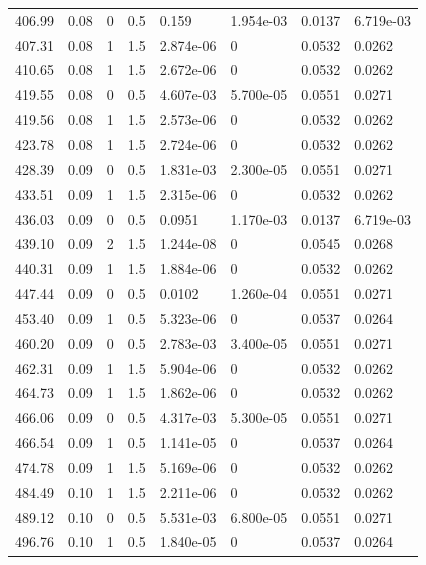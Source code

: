 \documentclass[preview]{standalone}
\begin{document}
{{{\begin{tabular}{L{1.2cm}C{1.2cm} C{0.3cm}C{0.5cm} C{1.4cm}C{1.4cm} C{1.4cm}C{1.4cm}}
  406.99  &  0.08  & 0     & 0.5 &  0.159  & 1.954e-03  & 0.0137 &  6.719e-03   \\ 
  407.31  &  0.08  & 1     & 1.5 &  2.874e-06  & 0  & 0.0532 &  0.0262   \\ 
  410.65  &  0.08  & 1     & 1.5 &  2.672e-06  & 0  & 0.0532 &  0.0262   \\ 
  419.55  &  0.08  & 0     & 0.5 &  4.607e-03  & 5.700e-05  & 0.0551 &  0.0271   \\ 
  419.56  &  0.08  & 1     & 1.5 &  2.573e-06  & 0  & 0.0532 &  0.0262   \\ 
  423.78  &  0.08  & 1     & 1.5 &  2.724e-06  & 0  & 0.0532 &  0.0262   \\ 
  428.39  &  0.09  & 0     & 0.5 &  1.831e-03  & 2.300e-05  & 0.0551 &  0.0271   \\ 
  433.51  &  0.09  & 1     & 1.5 &  2.315e-06  & 0  & 0.0532 &  0.0262   \\ 
  436.03  &  0.09  & 0     & 0.5 &  0.0951  & 1.170e-03  & 0.0137 &  6.719e-03   \\ 
  439.10  &  0.09  & 2     & 1.5 &  1.244e-08  & 0  & 0.0545 &  0.0268   \\ 
  440.31  &  0.09  & 1     & 1.5 &  1.884e-06  & 0  & 0.0532 &  0.0262   \\ 
  447.44  &  0.09  & 0     & 0.5 &  0.0102  & 1.260e-04  & 0.0551 &  0.0271   \\ 
  453.40  &  0.09  & 1     & 0.5 &  5.323e-06  & 0  & 0.0537 &  0.0264   \\ 
  460.20  &  0.09  & 0     & 0.5 &  2.783e-03  & 3.400e-05  & 0.0551 &  0.0271   \\ 
  462.31  &  0.09  & 1     & 1.5 &  5.904e-06  & 0  & 0.0532 &  0.0262   \\ 
  464.73  &  0.09  & 1     & 1.5 &  1.862e-06  & 0  & 0.0532 &  0.0262   \\ 
  466.06  &  0.09  & 0     & 0.5 &  4.317e-03  & 5.300e-05  & 0.0551 &  0.0271   \\ 
  466.54  &  0.09  & 1     & 0.5 &  1.141e-05  & 0  & 0.0537 &  0.0264   \\ 
  474.78  &  0.09  & 1     & 1.5 &  5.169e-06  & 0  & 0.0532 &  0.0262   \\ 
  484.49  &  0.10  & 1     & 1.5 &  2.211e-06  & 0  & 0.0532 &  0.0262   \\ 
  489.12  &  0.10  & 0     & 0.5 &  5.531e-03  & 6.800e-05  & 0.0551 &  0.0271   \\ 
  496.76  &  0.10  & 1     & 0.5 &  1.840e-05  & 0  & 0.0537 &  0.0264   \\ 

\end{tabular}}}}
\end{document}
